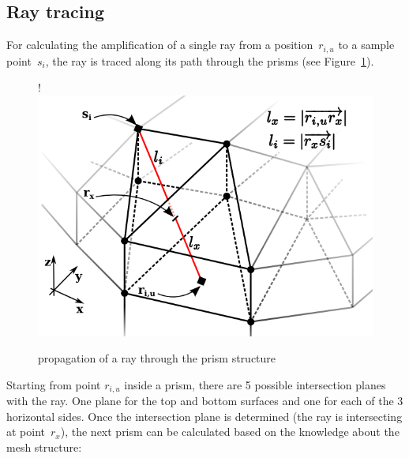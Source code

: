 \subsection{Ray tracing} \label{subsec:raytracing}
For calculating the amplification of a single ray from a position~$r_{i,u}$ to a sample
point~$s_i$, the ray is traced along its path through the prisms (see Figure~\ref{graphic:prism_propagation}). 

\begin{figure}[H]
  \centerline{
     {!} {\includegraphics{./graphics/prism_propagation_4.png}}
  }
  \caption{propagation of a ray through the prism structure}
  \label{graphic:prism_propagation}
\end{figure}
Starting from point $r_{i,u}$ inside a prism, there are 5 possible intersection
planes with the ray. One plane for the top and bottom surfaces and one for each
of the 3 horizontal sides. Once the intersection plane is determined (the ray is
intersecting at point~$r_x$), the next prism can be calculated based on the
knowledge about the mesh structure:

